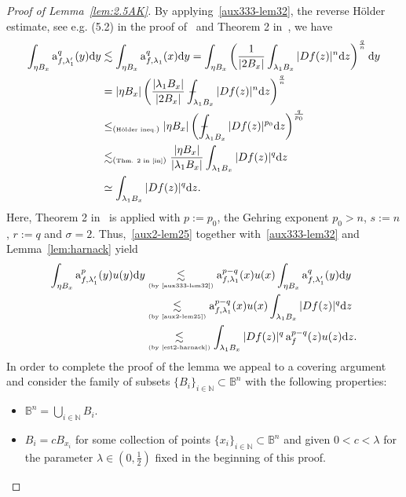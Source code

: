 \documentclass[11pt,a4paper,reqno]{amsart}
\theoremstyle{definition}
\def\vint{\mathop{\mathchoice%
          {\setbox0\hbox{$\displaystyle\intop$}\kern 0.22\wd0%
           \vcenter{\hrule width 0.6\wd0}\kern -0.82\wd0}%
          {\setbox0\hbox{$\textstyle\intop$}\kern 0.2\wd0%
           \vcenter{\hrule width 0.6\wd0}\kern -0.8\wd0}%
          {\setbox0\hbox{$\scriptstyle\intop$}\kern 0.2\wd0%
           \vcenter{\hrule width 0.6\wd0}\kern -0.8\wd0}%
          {\setbox0\hbox{$\scriptscriptstyle\intop$}\kern 0.2\wd0%
           \vcenter{\hrule width 0.6\wd0}\kern -0.8\wd0}}%
          \mathopen{}\int}
\renewcommand{\a}{\operatorname{a}}
\newcommand{\B}{\mathbb{B}^n}
\newcommand{\N}{\mathbb{N}}
\newcommand{\ud}{\mathrm {d}}
\numberwithin{komcounter}{section}
\begin{document}
\begin{proof}[Proof of Lemma~\ref{lem:2.5AK}]
By applying~\eqref{aux333-lem32},  the reverse H\"older estimate, see e.g. (5.2) in the proof of~\cite[Theorem 5.1]{bi} and Theorem 2 in~\cite{in}, we have 
\begin{align}
 \int_{\eta B_x}\a^q_{f,\lambda_1'}(y)\ud y &\lesssim  \int_{\eta B_x}\a^q_{f,\lambda_1}(x)\ud y 
 =\int_{\eta B_x}\left(\frac{1}{|2B_x|}\int_{\lambda_1 B_x}|Df(z)|^n\ud z \right)^\frac{q}{n}\ud y \nonumber \\
&  =  |\eta B_x|\left( \frac{|\lambda_1 B_x|}{|2B_x|}\vint_{\lambda_1 B_x} |Df(z)|^n \ud z \right)^{\frac{q}{n}} \nonumber\\
&\leq_{\tiny(\hbox{H\"older ineq.})} |\eta B_x|\left(\vint_{\lambda_1  B_x} |Df(z)|^{p_0}\ud z \right)^{\frac{q}{p_0}} \nonumber\\
& \lesssim_{\tiny(\hbox{Thm. 2 in~\cite{in}})} \frac{|\eta B_x|}{|\lambda_1 B_x|} \int_{\lambda_1 B_x}|Df(z)|^q\ud z\nonumber \\
&\simeq \int_{\lambda_1  B_x}|Df(z)|^q\ud z. \label{aux2-lem25}
\end{align}
 Here, Theorem 2 in~\cite{in} is applied with $p:=p_0$, the Gehring exponent $p_0>n$, $s:=n$, $r:=q$ and $\sigma=2$. Thus,~\eqref{aux2-lem25} together with~\eqref{aux333-lem32} and Lemma~\ref{lem:harnack} yield
\begin{align}
 \int_{\eta B_x} \a_{f,\lambda_1'}^{p}(y) u(y)\ud y & \underset{\hbox{\tiny{(by~\eqref{aux333-lem32})}}}{\lesssim} \a_{f,\lambda_1}^{p-q}(x)u(x)\int_{\eta B_x} \a^q_{f,\lambda_1'}(y) \ud y \nonumber \\
& \underset{\hbox{\tiny{(by~\eqref{aux2-lem25})}}}{\lesssim} \a_{f,\lambda_1}^{p-q}(x)u(x)\int_{\lambda_1 B_x}|Df(z)|^q\ud z  \nonumber \\
& \underset{\hbox{\tiny{(by~\eqref{est2-harnack})}}}{\lesssim} \int_{\lambda_1 B_x}|Df(z)|^q\a_{f}^{p-q}(z)u(z)\ud z. \label{eq:2.5(3)}
\end{align} 
In order to complete the proof of the lemma we appeal to a covering argument and consider the family of subsets $\{ B_i\}_{i\in\N}\subset\B$ with the following properties:
\begin{itemize}
\item[(C1)] $\B=\underset{i\in\N}{\bigcup}B_i$.
\item[(C2)] $B_i=c B_{x_i}$ for some collection of points $\{ x_i\}_{i\in\N}\subset\B$ and given $0<c<\lambda$ for the parameter $\lambda \in (0,\frac12)$ fixed in the beginning of this proof.

\end{itemize}
\end{proof}
\end{document}
